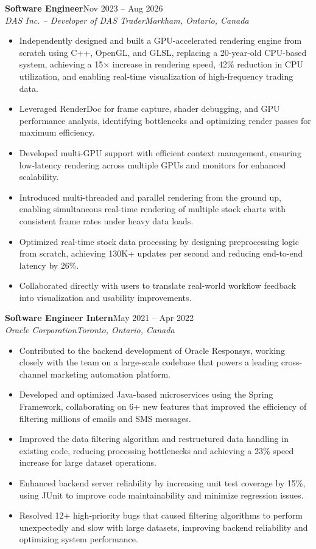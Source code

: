 \documentclass[10pt,letterpaper]{article}
\newcommand{\role}[4]{%
  \textbf{#1}\hfill #2\\
  \textit{#3}\hfill \textit{#4}\\[0.1em]
}
\begin{document}
\vspace{0.25em}
\role{Software Engineer}{Nov 2023 -- Aug 2026}{DAS Inc. -- Developer of DAS Trader}{Markham, Ontario, Canada}
\begin{itemize}
  \item Independently designed and built a GPU-accelerated rendering engine from scratch using C++, OpenGL,
        and GLSL, replacing a 20-year-old CPU-based system, achieving a 15$\times$ increase in rendering
        speed, 42\% reduction in CPU utilization, and enabling real-time visualization of high-frequency
        trading data.
  \item Leveraged RenderDoc for frame capture, shader debugging, and GPU performance analysis, identifying
        bottlenecks and optimizing render passes for maximum efficiency.
  \item Developed multi-GPU support with efficient context management, ensuring low-latency rendering across
        multiple GPUs and monitors for enhanced scalability.
  \item Introduced multi-threaded and parallel rendering from the ground up, enabling simultaneous real-time
        rendering of multiple stock charts with consistent frame rates under heavy data loads.
  \item Optimized real-time stock data processing by designing preprocessing logic from scratch, achieving
        130K+ updates per second and reducing end-to-end latency by 26\%.
  \item Collaborated directly with users to translate real-world workflow feedback into visualization and
        usability improvements.
\end{itemize}

\vspace{0.25em}
\role{Software Engineer Intern}{May 2021 -- Apr 2022}{Oracle Corporation}{Toronto, Ontario, Canada}
\begin{itemize}
  \item Contributed to the backend development of Oracle Responsys, working closely with the team on a
        large-scale codebase that powers a leading cross-channel marketing automation platform.
  \item Developed and optimized Java-based microservices using the Spring Framework, collaborating on 6+ new
        features that improved the efficiency of filtering millions of emails and SMS messages.
  \item Improved the data filtering algorithm and restructured data handling in existing code, reducing
        processing bottlenecks and achieving a 23\% speed increase for large dataset operations.
  \item Enhanced backend server reliability by increasing unit test coverage by 15\%, using JUnit to improve
        code maintainability and minimize regression issues.
  \item Resolved 12+ high-priority bugs that caused filtering algorithms to perform unexpectedly and slow
        with large datasets, improving backend reliability and optimizing system performance.
\end{itemize}
\end{document}
